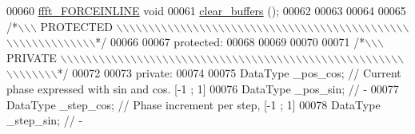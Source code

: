 \begin{DoxyCode}
00060     \hyperlink{a00089_a31b2ada863c9efa7455efae4e13661f3}{ffft\_FORCEINLINE} \textcolor{keywordtype}{void}
00061                         \hyperlink{a00020_a1be4a9ec10517ae2615d2925c05d7d29}{clear\_buffers} ();
00062 
00063 
00064 
00065 \textcolor{comment}{/*\(\backslash\)\(\backslash\)\(\backslash\) PROTECTED \(\backslash\)\(\backslash\)\(\backslash\)\(\backslash\)\(\backslash\)\(\backslash\)\(\backslash\)\(\backslash\)\(\backslash\)\(\backslash\)\(\backslash\)\(\backslash\)\(\backslash\)\(\backslash\)\(\backslash\)\(\backslash\)\(\backslash\)\(\backslash\)\(\backslash\)\(\backslash\)\(\backslash\)\(\backslash\)\(\backslash\)\(\backslash\)\(\backslash\)\(\backslash\)\(\backslash\)\(\backslash\)\(\backslash\)\(\backslash\)\(\backslash\)\(\backslash\)\(\backslash\)\(\backslash\)\(\backslash\)\(\backslash\)\(\backslash\)\(\backslash\)\(\backslash\)\(\backslash\)\(\backslash\)\(\backslash\)\(\backslash\)\(\backslash\)\(\backslash\)\(\backslash\)\(\backslash\)\(\backslash\)\(\backslash\)\(\backslash\)\(\backslash\)\(\backslash\)\(\backslash\)\(\backslash\)\(\backslash\)\(\backslash\)\(\backslash\)\(\backslash\)\(\backslash\)\(\backslash\)*/}
00066 
00067 \textcolor{keyword}{protected}:
00068 
00069 
00070 
00071 \textcolor{comment}{/*\(\backslash\)\(\backslash\)\(\backslash\) PRIVATE \(\backslash\)\(\backslash\)\(\backslash\)\(\backslash\)\(\backslash\)\(\backslash\)\(\backslash\)\(\backslash\)\(\backslash\)\(\backslash\)\(\backslash\)\(\backslash\)\(\backslash\)\(\backslash\)\(\backslash\)\(\backslash\)\(\backslash\)\(\backslash\)\(\backslash\)\(\backslash\)\(\backslash\)\(\backslash\)\(\backslash\)\(\backslash\)\(\backslash\)\(\backslash\)\(\backslash\)\(\backslash\)\(\backslash\)\(\backslash\)\(\backslash\)\(\backslash\)\(\backslash\)\(\backslash\)\(\backslash\)\(\backslash\)\(\backslash\)\(\backslash\)\(\backslash\)\(\backslash\)\(\backslash\)\(\backslash\)\(\backslash\)\(\backslash\)\(\backslash\)\(\backslash\)\(\backslash\)\(\backslash\)\(\backslash\)\(\backslash\)\(\backslash\)\(\backslash\)\(\backslash\)\(\backslash\)\(\backslash\)\(\backslash\)\(\backslash\)\(\backslash\)\(\backslash\)\(\backslash\)\(\backslash\)\(\backslash\)*/}
00072 
00073 \textcolor{keyword}{private}:
00074 
00075     DataType            \_pos\_cos;       \textcolor{comment}{// Current phase expressed with sin and cos. [-1 ; 1]}
00076     DataType            \_pos\_sin;       \textcolor{comment}{// -}
00077     DataType            \_step\_cos;      \textcolor{comment}{// Phase increment per step, [-1 ; 1]}
00078     DataType            \_step\_sin;      \textcolor{comment}{// -}

\end{DoxyCode}
